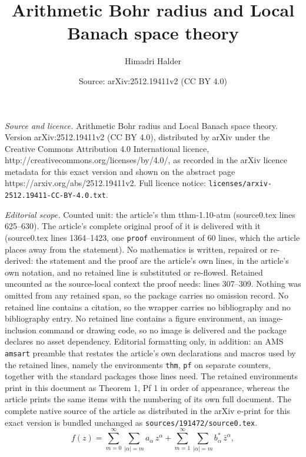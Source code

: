 \documentclass[10pt,a4paper]{amsart}
\title{Arithmetic Bohr radius and Local Banach space theory}
\author{Himadri Halder}
\date{Source: arXiv:2512.19411v2 (CC BY 4.0)}
\begin{document}
\maketitle

\noindent\emph{Source and licence.} Arithmetic Bohr radius and Local Banach space theory. Version arXiv:2512.19411v2 (CC BY 4.0), distributed by arXiv under the Creative Commons Attribution 4.0 International licence, http://creativecommons.org/licenses/by/4.0/, as recorded in the arXiv licence metadata for this exact version and shown on the abstract page https://arxiv.org/abs/2512.19411v2. Full licence notice: \texttt{licenses/arxiv-2512.19411-CC-BY-4.0.txt}.\par\smallskip

\noindent\textit{Editorial scope.} Counted unit: the article's thm tthm-1.10-atm (source0.tex lines 625--630). The article's complete original proof of it is delivered with it (source0.tex lines 1364--1423, one \texttt{proof} environment of 60 lines, which the article places away from the statement). No mathematics is written, repaired or re-derived: the statement and the proof are the article's own lines, in the article's own notation, and no retained line is substituted or re-flowed.  Retained uncounted as the source-local context the proof needs: lines 307--309.  Nothing was omitted from any retained span, so the package carries no omission record.  No retained line contains a citation, so the wrapper carries no bibliography and no bibliography entry.  No retained line contains a figure environment, an image-inclusion command or drawing code, so no image is delivered and the package declares no asset dependency.  Editorial formatting only, in addition: an AMS \texttt{amsart} preamble that restates the article's own declarations and macros used by the retained lines, namely the environments \texttt{thm}, \texttt{pf} on separate counters, together with the standard packages those lines need.  The retained environments print in this document as Theorem 1, Pf 1 in order of appearance, whereas the article prints the same items with the numbering of its own full document.  The complete native source of the article as distributed in the arXiv e-print for this exact version is bundled unchanged as \texttt{sources/191472/source0.tex}.
\begin{equation} \label{e-1.3-a}
	f(z)=\sum_{m=0}^{\infty} \sum_{|\alpha|=m} a_{\alpha}\, z^{\alpha} + \sum_{m=1}^{\infty} \sum_{|\alpha|=m} b^{*}_{\alpha}\, \bar{z}^{\alpha},
\end{equation} 
\end{document}
